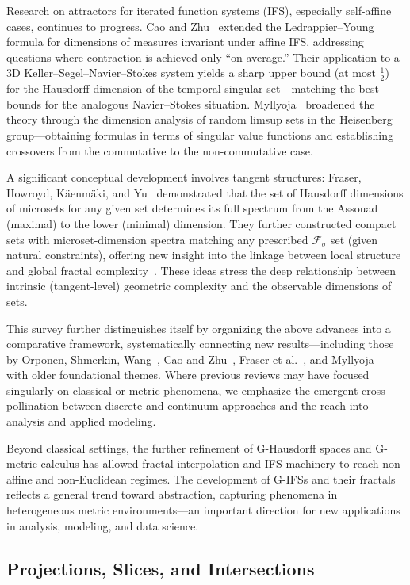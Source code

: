 \documentclass[sigconf]{acmart}
\begin{document}
Research on attractors for iterated function systems (IFS), especially self-affine cases, continues to progress. Cao and Zhu~\cite{ref70} extended the Ledrappier–Young formula for dimensions of measures invariant under affine IFS, addressing questions where contraction is achieved only ``on average.'' Their application to a 3D Keller–Segel–Navier–Stokes system yields a sharp upper bound (at most $\frac{1}{2}$) for the Hausdorff dimension of the temporal singular set—matching the best bounds for the analogous Navier–Stokes situation. Myllyoja~\cite{ref73} broadened the theory through the dimension analysis of random limsup sets in the Heisenberg group—obtaining formulas in terms of singular value functions and establishing crossovers from the commutative to the non-commutative case.

A significant conceptual development involves tangent structures: Fraser, Howroyd, Käenmäki, and Yu~\cite{ref72} demonstrated that the set of Hausdorff dimensions of microsets for any given set determines its full spectrum from the Assouad (maximal) to the lower (minimal) dimension. They further constructed compact sets with microset-dimension spectra matching any prescribed $\mathcal{F}_\sigma$ set (given natural constraints), offering new insight into the linkage between local structure and global fractal complexity~\cite{ref72}. These ideas stress the deep relationship between intrinsic (tangent-level) geometric complexity and the observable dimensions of sets.

This survey further distinguishes itself by organizing the above advances into a comparative framework, systematically connecting new results—including those by Orponen, Shmerkin, Wang~\cite{ref68,ref92}, Cao and Zhu~\cite{ref70}, Fraser et al.~\cite{ref72}, and Myllyoja~\cite{ref73}—with older foundational themes. Where previous reviews may have focused singularly on classical or metric phenomena, we emphasize the emergent cross-pollination between discrete and continuum approaches and the reach into analysis and applied modeling.

Beyond classical settings, the further refinement of G-Hausdorff spaces and G-metric calculus has allowed fractal interpolation and IFS machinery to reach non-affine and non-Euclidean regimes. The development of G-IFSs and their fractals reflects a general trend toward abstraction, capturing phenomena in heterogeneous metric environments—an important direction for new applications in analysis, modeling, and data science.

\subsection{Projections, Slices, and Intersections}
\end{document}
